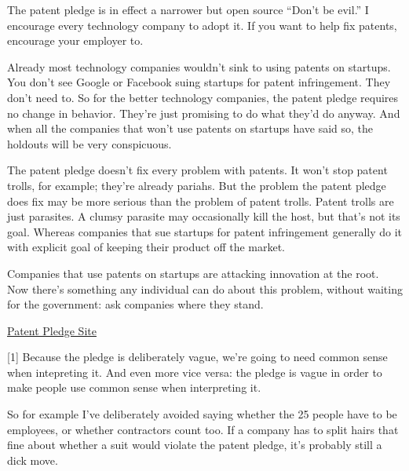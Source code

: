 The patent pledge is in effect a narrower but open source ``Don't be
evil.'' I encourage every technology company to adopt it. If you want to
help fix patents, encourage your employer to.

Already most technology companies wouldn't sink to using patents on
startups. You don't see Google or Facebook suing startups for patent
infringement. They don't need to. So for the better technology
companies, the patent pledge requires no change in behavior. They're
just promising to do what they'd do anyway. And when all the companies
that won't use patents on startups have said so, the holdouts will be
very conspicuous.

The patent pledge doesn't fix every problem with patents. It won't stop
patent trolls, for example; they're already pariahs. But the problem the
patent pledge does fix may be more serious than the problem of patent
trolls. Patent trolls are just parasites. A clumsy parasite may
occasionally kill the host, but that's not its goal. Whereas companies
that sue startups for patent infringement generally do it with explicit
goal of keeping their product off the market.

Companies that use patents on startups are attacking innovation at the
root. Now there's something any individual can do about this problem,
without waiting for the government: ask companies where they stand.

\href{http://thepatentpledge.org}{Patent Pledge Site}

{[}1{]} Because the pledge is deliberately vague, we're going to need
common sense when intepreting it. And even more vice versa: the pledge
is vague in order to make people use common sense when interpreting it.

So for example I've deliberately avoided saying whether the 25 people
have to be employees, or whether contractors count too. If a company has
to split hairs that fine about whether a suit would violate the patent
pledge, it's probably still a dick move.
